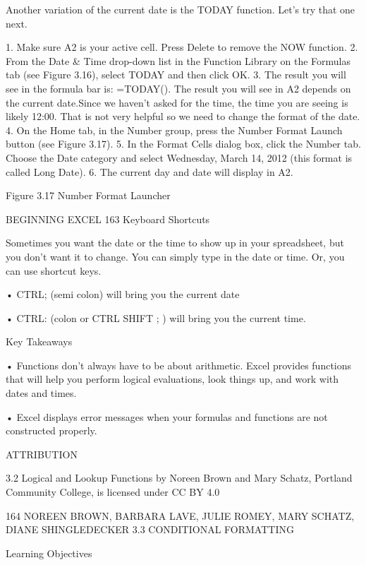 Another variation of the current date is the TODAY function. Let’s try that one next.

1. Make sure A2 is your active cell. Press Delete to remove the NOW function.
2. From the Date & Time drop-down list in the Function Library on the Formulas tab (see Figure
3.16), select TODAY and then click OK.
3. The result you will see in the formula bar is: =TODAY(). The result you will see in A2 depends
on the current date.Since we haven’t asked for the time, the time you are seeing is likely 12:00.
That is not very helpful so we need to change the format of the date.
4. On the Home tab, in the Number group, press the Number Format Launch button (see Figure
3.17).
5. In the Format Cells dialog box, click the Number tab. Choose the Date category and select
Wednesday, March 14, 2012 (this format is called Long Date).
6. The current day and date will display in A2.




Figure 3.17 Number Format Launcher




BEGINNING EXCEL 163
Keyboard Shortcuts


Sometimes you want the date or the time to show up in your spreadsheet, but you don’t want it to change. You can simply
type in the date or time. Or, you can use shortcut keys.

• CTRL; (semi colon) will bring you the current date

• CTRL: (colon or CTRL SHIFT ; ) will bring you the current time.




Key Takeaways


• Functions don’t always have to be about arithmetic. Excel provides functions that will help you perform
logical evaluations, look things up, and work with dates and times.

• Excel displays error messages when your formulas and functions are not constructed properly.



ATTRIBUTION

3.2 Logical and Lookup Functions by Noreen Brown and Mary Schatz, Portland Community College,
is licensed under CC BY 4.0




164 NOREEN BROWN, BARBARA LAVE, JULIE ROMEY, MARY SCHATZ, DIANE SHINGLEDECKER
3.3 CONDITIONAL FORMATTING




Learning Objectives


